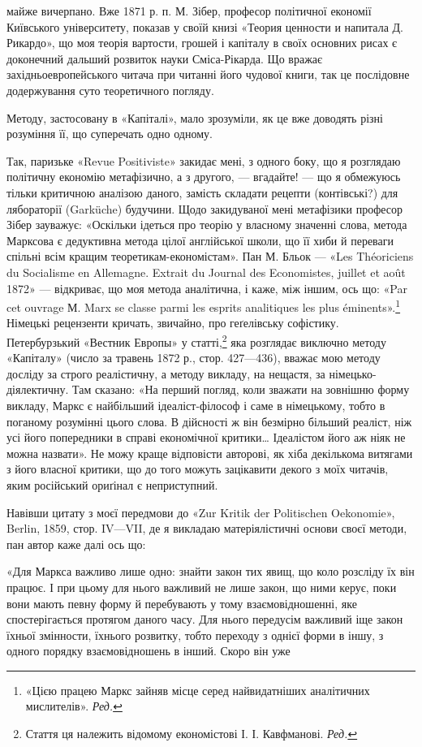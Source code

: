 \parcont{}  %
майже вичерпано. Вже 1871 р. п. М. Зібер, професор політичної
економії Київського університету, показав у своїй книзі «Теория
ценности и напитала Д. Рикардо», що моя теорія вартости, грошей
і капіталу в своїх основних рисах є доконечний дальший
розвиток науки Сміса-Рікарда. Що вражає західньоевропейського
читача при читанні його чудової книги, так це послідовне
додержування суто теоретичного погляду.

Методу, застосовану в «Капіталі», мало зрозуміли, як це вже
доводять різні розуміння її, що суперечать одно одному.

Так, паризьке «Revue Positiviste» закидає мені, з одного боку,
що я розглядаю політичну економію метафізично, а з другого, —
вгадайте! — що я обмежуюсь тільки критичною аналізою даного,
замість складати рецепти (контівські?) для лябораторії (Garküche)
будучини. Щодо закидуваної мені метафізики професор Зібер зауважує:
«Оскільки ідеться про теорію у власному значенні слова,
метода Марксова є дедуктивна метода цілої англійської школи,
що її хиби й переваги спільні всім кращим теоретикам-економістам».
Пан М. Бльок — «Les Théoriciens du Socialisme en Allemagne.
Extrait du Journal des Economistes, juillet et août 1872» —
відкриває, що моя метода аналітична, і каже, між іншим, ось що:
«Par cet ouvrage М. Marx se classe parmi les esprits analitiques les
plus éminents».\footnote*{
«Цією працею Маркс зайняв місце серед найвидатніших аналітичних
мислителів». \emph{Ред.}
} Німецькі рецензенти кричать, звичайно, про
геґелівську софістику. Петербурзький «Вестник Европы» у
статті,\footnote*{
Стаття ця належить відомому економістові І. І. Кавфманові. \emph{Ред.}
} яка розглядає виключно методу «Капіталу» (число за
травень 1872 р., стор. 427—436), вважає мою методу досліду за
строго реалістичну, а методу викладу, на нещастя, за німецько-діялектичну.
Там сказано: «На перший погляд, коли зважати на
зовнішню форму викладу, Маркс є найбільший ідеаліст-філософ
і саме в німецькому, тобто в поганому розумінні цього слова.
В дійсності ж він безмірно більший реаліст, ніж усі його попередники
в справі економічної критики\dots{} Ідеалістом його аж ніяк не
можна назвати». Не можу краще відповісти авторові, як хіба
декількома витягами з його власної критики, що до того можуть
зацікавити декого з моїх читачів, яким російський ориґінал є
неприступний.

Навівши цитату з моєї передмови до «Zur Kritik der Politischen
Oekonomie», Berlin, 1859, стор. IV—VII, де я викладаю
матеріялістичні основи своєї методи, пан автор каже далі ось що:

«Для Маркса важливо лише одно: знайти закон тих явищ, що
коло розсліду їх він працює. І при цьому для нього важливий не
лише закон, що ними керує, поки вони мають певну форму й перебувають
у тому взаємовідношенні, яке спостерігається протягом
даного часу. Для нього передусім важливий іще закон їхньої
змінности, їхнього розвитку, тобто переходу з однієї форми в
іншу, з одного порядку взаємовідношень в інший. Скоро він уже
\parbreak{}  %
